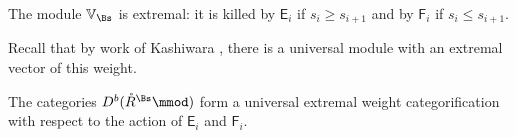 \begin{proposition}
 The module $\mathbb{V}_{\Bs}$ is extremal: it is killed by $\mathsf{E}_i$ if $s_i\geq s_{i+1}$ and by $\mathsf{F}_i$ if $s_{i}\leq s_{i+1}$.
\end{proposition}

Recall that by work of Kashiwara \cite{Kashlevel}, there is a
universal module with an extremal vector of this weight.  

\begin{proposition}
  The categories $D^b(\mathring{{R}}^\Bs\mmod)$ form a universal
  extremal weight categorification with respect to the action of
  $\mathsf{E}_i$ and $\mathsf{F}_i$.
\end{proposition}





